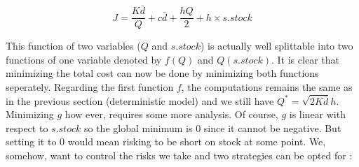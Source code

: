 \[ J = \frac{K\bar d}{Q} + c\bar d + \frac{hQ}{2} + h\times s.stock \]

This function of two variables ($Q$ and $s.stock$) is actually well splittable into two functions of one variable denoted by $f(Q)$ and $Q(s.stock)$. It is clear that minimizing the total cost can now be done by minimizing both functions seperately. Regarding the first function $f$, the computations remains the same as in the previous section (deterministic model) and we still have $Q^* = \sqrt{2K\bar d}{h}$. Minimizing $g$ how ever, requires some more analysis. Of course, $g$ is linear with respect to $s.stock$ so the global minimum is $0$ since it cannot be negative. But setting it to $0$ would mean risking to be short on stock at some point. We, somehow, want to control the risks we take and two strategies can be opted for :

